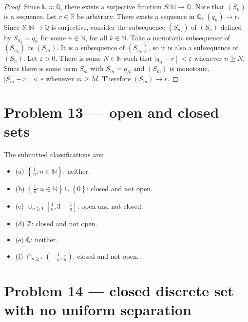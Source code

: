\begin{proof}

Since \(\mathbb{N} \approx \mathbb{Q}\), there exists a surjective function \(S:\mathbb{N}\rightarrow\mathbb{Q}\). Note that \(\left( S_{n} \right)\) is a sequence. Let \(r \in \mathbb{R}\) be arbitrary. There exists a sequence in \(\mathbb{Q}\), \(\left( q_{n} \right)\rightarrow r\). Since \(S:\mathbb{N}\rightarrow\mathbb{Q}\) is surjective, consider the subsequence \(\left( S_{n_{k}} \right)\) of \(\left( S_{n} \right)\) defined by \(S_{n_{k}} = q_{n}\) for some \(n \in \mathbb{N}\), for all \(k \in \mathbb{N}\). Take a monotonic subsequence of \(\left( S_{n_{k}} \right)\) as \(\left( S_{m} \right)\). It is a subsequence of \(\left( S_{n_{k}} \right)\), so it is also a subsequence of \(\left( S_{n} \right)\). Let \(\varepsilon > 0\). There is some \(N \in \mathbb{N}\) such that \(\left. |q_{n} - r \middle| < \varepsilon \right.\) whenever \(n \geq N\). Since there is some term \(S_{m}\) with \(S_{m} = q_{N}\) and \(\left( S_{m} \right)\) is monotonic, \(\left. |S_{m} - r \middle| < \varepsilon \right.\) whenever \(m \geq M\). Therefore \(\left( S_{m} \right)\rightarrow r\).

\end{proof}

\section{Problem 13 --- open and closed sets}

The submitted classifications are:

\begin{itemize}
\tightlist
\item
  (a) \(\left\{ {\frac{1}{n}:n \in \mathbb{N}} \right\}\): neither.
\item
  (b) \(\left\{ {\frac{1}{n}:n \in \mathbb{N}} \right\} \cup \left\{ 0 \right\}\): closed and not open.
\item
  (c) \(\cup_{n \geq 1}\left\lbrack {\frac{1}{n},3 - \frac{1}{n}} \right\rbrack\): open and not closed.
\item
  (d) \(\mathbb{Z}\): closed and not open.
\item
  (e) \(\mathbb{Q}\): neither.
\item
  (f) \(\cap_{n \geq 1}\left( {- \frac{1}{n},\frac{1}{n}} \right)\): closed and not open.
\end{itemize}

\section{Problem 14 --- closed discrete set with no uniform separation}

